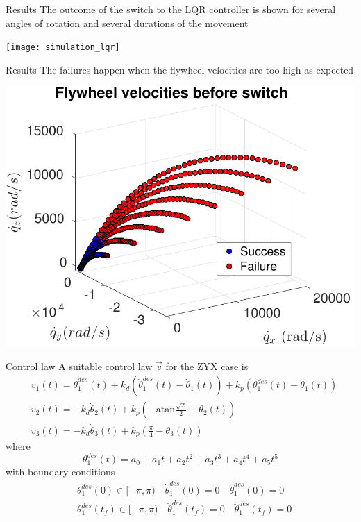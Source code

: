 \begin{frame}{Results \hfill \color{red}{XYZ}}
  The outcome of the switch to the LQR controller
  is shown for several angles of rotation and several durations of the movement
  \par
  \centering
  \texttt{[image: simulation\_lqr]}
\end{frame}

\begin{frame}{Results \hfill \color{red}{XYZ}}
  The failures happen when the flywheel velocities are too high as expected
  \par
  \centering
  \includegraphics[scale=0.62]{simulation_lqr_velocities}
\end{frame}

\begin{frame}{Control law \hfill \color{dgreen}{ZYX}}
  A suitable control law $\vec{v}$ for the \textcolor{dgreen}{ZYX} case is
  {\small
    \[
    \begin{split}
      &v_1(t) = \ddot{\theta}_1^{des}(t) + k_d(\dot{\theta}_1^{des}(t) - \dot{\theta}_1(t)) + k_p (\theta_1^{des}(t) - \theta_1(t))\\
      &v_2(t) = - k_d\dot{\theta}_2(t) + k_p \left(-\mathrm{atan}\frac{\sqrt{2}}{2} - \theta_2(t)\right)\\
      &v_3(t) = - k_d\dot{\theta}_3(t) + k_p \left(\frac{\pi}{4} - \theta_3(t)\right)
    \end{split}
    \]
  }where
  \[
  \theta_1^{des}(t) = a_0 + a_1 t + a_2 t^2 + a_3 t^3 + a_4 t^4 + a_5 t^5
  \]
  with boundary conditions
  \[
  \begin{split}
    &\theta_1^{des}(0) \in [-\pi, \pi) \quad \dot{\theta}_1^{des}(0)= 0 \quad \ddot{\theta}_1^{des}(0) = 0\\
      &\theta_1^{des}(t_{f}) \in [-\pi, \pi)  \quad \dot{\theta}_1^{des}(t_{f})= 0 \quad \ddot{\theta}_1^{des}(t_{f}) = 0
  \end{split}
  \]
\end{frame}

